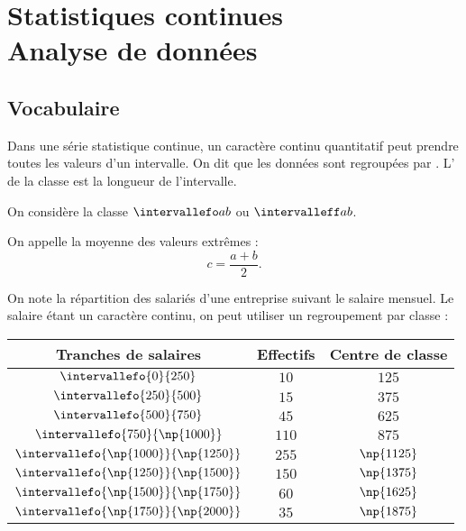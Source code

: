 \documentclass[10pt,openright,twoside,french]{book}
\begin{document}
\renewcommand\PartProgramme{Stats/Probas}
\chapter[Statistiques continues]{Statistiques continues\\ Analyse de données}\label{ch_statistiques_continues}

\section{Vocabulaire}

\begin{Defi}
    Dans une série statistique continue, un caractère continu quantitatif peut prendre toutes les valeurs d'un intervalle. On dit que les données sont regroupées par . L' de la classe est la longueur de l'intervalle.
\end{Defi}

\begin{Defi}
    On considère la classe $\intervallefo a b$ ou $\intervalleff a b$.\par
    On appelle  la moyenne des valeurs extrêmes : \[c = \frac{a + b}{2}.\]
\end{Defi}

\begin{Exemple}
    On note la répartition des salariés d'une entreprise suivant le salaire mensuel. Le salaire étant un caractère continu, on peut utiliser un regroupement par classe :
    \begin{center}
    \renewcommand\arraystretch{2}
        \begin{tabular}{|c|c|c|}
            \hline
                Tranches de salaires & Effectifs & Centre de classe \\
            \hline
                $\intervallefo{0}{250}$ & $10$ & $125$\\
            \hline
                $\intervallefo{250}{500}$ & $15$ & $375$\\
            \hline
                $\intervallefo{500}{750}$ & $45$ & $625$\\
            \hline
                $\intervallefo{750}{\np{1000}}$ & $110$ & $875$\\
            \hline
                $\intervallefo{\np{1000}}{\np{1250}}$ & $255$ & $\np{1125}$\\
            \hline
                $\intervallefo{\np{1250}}{\np{1500}}$ & $150$ & $\np{1375}$\\
            \hline
                $\intervallefo{\np{1500}}{\np{1750}}$ & $60$ & $\np{1625}$ \\
            \hline
                $\intervallefo{\np{1750}}{\np{2000}}$ & $35$ & $\np{1875}$ \\
            \hline
        \end{tabular}
    \renewcommand\arraystretch{1}
    \end{center}
\end{Exemple}
\end{document}
